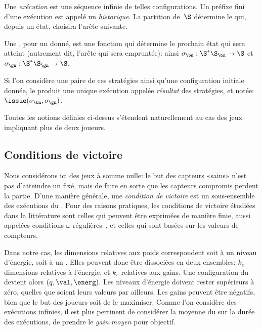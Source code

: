 Une \emph{exécution} est une séquence infinie de telles configurations.
Un préfixe fini d'une exécution est appelé un \emph{historique}.
La partition de~$\S$ détermine le  qui, depuis un état, choisira l'arête suivante.

Une \emph{}, pour un  donné, est une fonction qui détermine le prochain état qui sera atteint (autrement dit, l'arête qui sera empruntée): ainsi $\sigma_\bn: \S^* \S_\bn \rightarrow \S$ et $\sigma_\gn: \S^* \S_\gn \rightarrow \S$.

Si l'on considère une paire de ces stratégies ainsi qu'une configuration initiale donnée, le  produit une unique exécution appelée \emph{résultat} des stratégies, et notée: $\issue(\sigma_\bn,\sigma_\gn)$.

\begin{remark}
Toutes les notions définies ci-dessus s'étendent naturellement au cas des jeux impliquant plus de deux joueurs.
\end{remark}

\subsection{Conditions de victoire}

Nous considérons ici des jeux à somme nulle: le but des capteurs «sains» n'est pas d'atteindre un  fixé, mais de faire en sorte que les capteurs compromis perdent la partie.
D'une manière générale, une \emph{condition de victoire} est un sous-ensemble des exécutions du .
Pour des raisons pratiques, les conditions de victoire étudiées dans la littérature sont celles qui peuvent être exprimées de manière finie, aussi appelées conditions $\omega$-régulières~\cite{GTW02}, et celles qui sont basées sur les valeurs de compteurs.

Dans notre cas, les dimensions relatives aux poids correspondent soit à un niveau d'énergie, soit à un .
Elles peuvent donc être dissociées en deux ensembles: $k_e$ dimensions relatives à l'énergie, et $k_v$ relatives aux gains.
Une configuration du  devient alors $(q,\val,\energ)$.
Les niveaux d'énergie doivent rester supérieurs à zéro, quelles que soient leurs valeurs par ailleurs.
Les gains peuvent être négatifs, bien que le but des joueurs soit de le maximiser.
Comme l'on considère des exécutions infinies, il est plus pertinent de considérer la moyenne du  sur la durée des exécutions, \cad de prendre le \emph{gain moyen} pour objectif.

